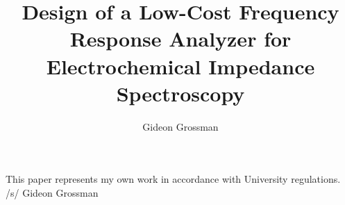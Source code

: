 \documentclass[lof,lot,los,12pt,advisercopy]{puseniorthesis}
\author{Gideon Grossman}
\title{Design of  a Low-Cost Frequency Response Analyzer for Electrochemical Impedance Spectroscopy}
\numberwithin{equation}{section}
\begin{document}



\begin{center}
This paper represents my own work in accordance with University regulations.  \newline
/s/ Gideon Grossman
\end{center}



\nocite{*}

\appendix

\end{document}
